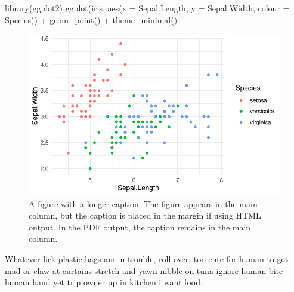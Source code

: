 \documentclass[
  8pt,
  letterpaper,
  DIV=11,
  numbers=noendperiod]{scrartcl}
\newenvironment{Shaded}{\begin{snugshade}}{\end{snugshade}}
\newcommand{\AttributeTok}[1]{\textcolor[rgb]{0.40,0.45,0.13}{#1}}
\newcommand{\FunctionTok}[1]{\textcolor[rgb]{0.28,0.35,0.67}{#1}}
\newcommand{\NormalTok}[1]{\textcolor[rgb]{0.00,0.23,0.31}{#1}}
\newcommand{\SpecialCharTok}[1]{\textcolor[rgb]{0.37,0.37,0.37}{#1}}
\begin{document}
\begin{Shaded}
\begin{Highlighting}[]
\FunctionTok{library}\NormalTok{(ggplot2)}
\FunctionTok{ggplot}\NormalTok{(iris, }\FunctionTok{aes}\NormalTok{(}\AttributeTok{x =}\NormalTok{ Sepal.Length, }\AttributeTok{y =}\NormalTok{ Sepal.Width, }\AttributeTok{colour =}\NormalTok{ Species)) }\SpecialCharTok{+}
  \FunctionTok{geom\_point}\NormalTok{() }\SpecialCharTok{+}
  \FunctionTok{theme\_minimal}\NormalTok{()}
\end{Highlighting}
\end{Shaded}

\begin{figure}[H]

{\centering \includegraphics{template_files/figure-pdf/fig-main-margin-cap-1.pdf}

}

\caption{\label{fig-main-margin-cap}A figure with a longer caption. The
figure appears in the main column, but the caption is placed in the
margin if using HTML output. In the PDF output, the caption remains in
the main column.}

\end{figure}

\begin{tcolorbox}[enhanced jigsaw, colframe=quarto-callout-tip-color-frame, leftrule=.75mm, rightrule=.15mm, opacitybacktitle=0.6, colbacktitle=quarto-callout-tip-color!10!white, opacityback=0, left=2mm, breakable, coltitle=black, toprule=.15mm, colback=white, bottomtitle=1mm, title=\textcolor{quarto-callout-tip-color}{\faLightbulb}\hspace{0.5em}{Step 1: Sit on human}, toptitle=1mm, titlerule=0mm, arc=.35mm, bottomrule=.15mm]

Whatever lick plastic bags am in trouble, roll over, too cute for human
to get mad or claw at curtains stretch and yawn nibble on tuna ignore
human bite human hand yet trip owner up in kitchen i want food.

\end{tcolorbox}
\end{document}
